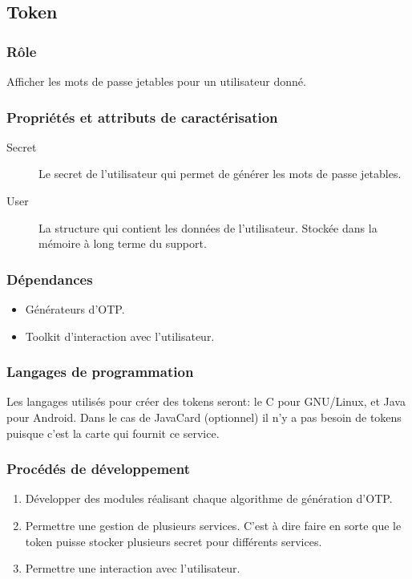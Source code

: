 \documentclass{"../../res/univ-projet"}
\begin{document}
\subsection{Token}
    \subsubsection{Rôle}
        Afficher les mots de passe jetables pour un utilisateur donné.

    \subsubsection{Propriétés et attributs de caractérisation}
    \begin{description}
        \item[Secret] Le secret de l'utilisateur qui permet de générer les
            mots de passe jetables.
        \item[User] La structure qui contient les données de l'utilisateur.
            Stockée dans la mémoire à long terme du support.
    \end{description}

    \subsubsection{Dépendances}
        \begin{itemize}
            \item Générateurs d'OTP.
            \item Toolkit d'interaction avec l'utilisateur.
        \end{itemize}

    \subsubsection{Langages de programmation}
        Les langages utilisés pour créer des tokens seront: le C pour GNU/Linux,
    et Java pour Android. Dans le cas de JavaCard (optionnel) il n'y a pas besoin
    de tokens puisque c'est la carte qui fournit ce service.

    \subsubsection{Procédés de développement}
    \begin{enumerate}
        \item Développer des modules réalisant chaque algorithme de génération
            d'OTP.
	\item Permettre une gestion de plusieurs services. C'est à dire
	  faire en sorte que le token puisse stocker plusieurs secret
	  pour différents services.
        \item Permettre une interaction avec l'utilisateur.
    \end{enumerate}
\end{document}
